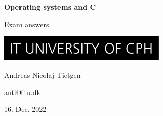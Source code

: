 \documentclass[11pt]{article}
\begin{document}
\begin{titlepage}
    \begin{center}
        \huge
        \textbf{Operating systems and C}

        \vspace{0.5cm}
        Exam answers

        \vspace{3cm}
        \includegraphics[width=0.6\textwidth]{itu.jpeg}

        \vspace{3cm}
        \large
        Andreas Nicolaj Tietgen 
        
        anti@itu.dk

        \vfill
        16. Dec. 2022
    \end{center}
\end{titlepage}

\newpage

\tableofcontents

\newpage






\newpage
\printbibliography

\newpage

\end{document}
